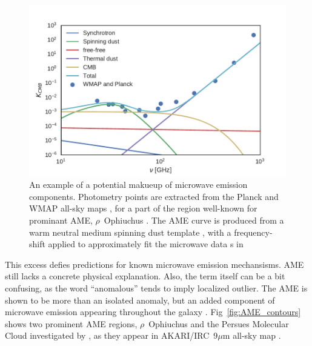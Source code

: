             \begin{figure}
              \centering
              \includegraphics[width=\textwidth]{../Plots/ch_intro/mw_foregrounds_demo_rOph.pdf}
                \caption{An example of a potential makueup of microwave emission components. Photometry points are extracted from the Planck and WMAP all-sky maps \citep{hfi14viii}, for a part of the region well-known for prominant AME, $\rho$~Ophiuchus \citep{planckxx11}. The AME curve is produced from a warm neutral medium spinning dust template \citep{ali-haimoud09}, with a frequency-shift applied to approximately fit the microwave data s in \cite{planck15X}}
              \label{fig:mw_foregrounds_demo_rOph}
            \end{figure}
        This excess defies predictions for known microwave emission mechansisms. AME still lacks a concrete physical explanation. Also, the term itself can be a bit confusing, as the word ``anomalous'' tends to imply localized outlier. The AME is shown to be more than an isolated anomaly, but an added component of microwave emission appearing throughout the galaxy \citep{deoliveiracosta97,wmap03b,dickinson13r}. Fig~\ref{fig:AME_contours} shows two prominent AME regions, $\rho{}$~Ophiuchus and the Persues Molecular Cloud investigated by \cite{tibbs11,planckxx11}, as they appear in AKARI/IRC~9$\mu$m all-sky map \citep{ishihara10}.
